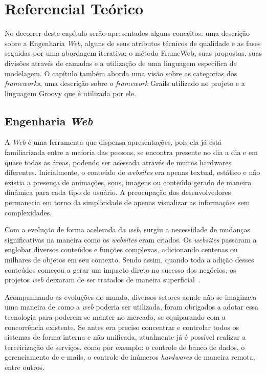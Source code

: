 \chapter{Referencial Teórico}
\label{sec-referencial}

No decorrer deste capítulo serão apresentados alguns conceitos: uma descrição sobre a Engenharia \textit{Web}, alguns de seus atributos técnicos de qualidade e as fases seguidas por uma abordagem iterativa; o método FrameWeb, suas propostas, suas divisões através de camadas e a utilização de uma linguagem específica de modelagem. O capítulo também aborda uma visão sobre as categorias dos \textit{frameworks}, uma descrição sobre o \textit{framework} Grails utilizado no projeto e a linguagem Groovy que é utilizada por ele.      

\section{Engenharia \textit{Web}}
\label{sec-ref-engenharia-web}


A \textit{Web} é uma ferramenta que dispensa apresentações, pois ela já está familiarizada entre a maioria das pessoas, se encontra presente no dia a dia e em quase todas as áreas, podendo ser acessada através de muitos hardwares diferentes. Inicialmente, o conteúdo de \textit{websites} era apenas textual, estático e não existia a presença de animações, sons, imagens ou conteúdo gerado de maneira dinâmica para cada tipo de usuário. A preocupação dos desenvolvedores permanecia em torno da simplicidade de apenas visualizar as informações sem complexidades.

Com a evolução de forma acelerada da \textit{web}, surgiu a necessidade de mudanças significativas na maneira como os \textit{websites} eram criados. Os \textit{websites} passaram a englobar diversos conteúdos e funções complexas, adicionando centenas ou milhares de objetos em seu contexto. Sendo assim, quando toda a adição desses conteúdos começou a gerar um impacto direto no sucesso dos negócios, os projetos \textit{web} deixaram de ser tratados de maneira superficial~\cite{pressman:es11}.

Acompanhando as evoluções do mundo, diversos setores aonde não se imaginava uma maneira de como a \textit{web} poderia ser utilizada, foram obrigados a adotar essa tecnologia para poderem se manter no mercado, se equiparando com a concorrência existente. Se antes era preciso concentrar e controlar todos os sistemas de forma interna e não unificada, atualmente já é possível realizar a terceirização de serviços, como por exemplo: o controle de banco de dados, o gerenciamento de e-mails, o controle de inúmeros \textit{hardwares} de maneira remota, entre outros.

